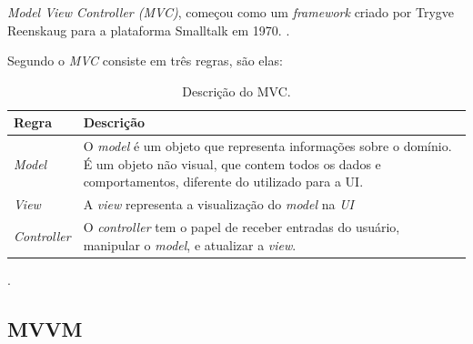 \textit{Model View Controller (MVC)}, começou como um \textit{framework} criado por Trygve Reenskaug para a plataforma Smalltalk em 1970. \cite[p.~321]{martin_fowler_patterns}.

Segundo  o \textit{MVC} consiste em três regras, são elas:

\begin{table}[htdp]
    \begin{center}
        \begin{tabular}{|l|p{10cm}|}
            \hline \textbf{Regra} & \textbf{Descrição} \\
            \hline \textit{Model} & 
            O \textit{model} é um objeto que representa informações sobre o domínio. É um objeto não visual, que contem todos os dados e comportamentos, diferente do utilizado para a UI. \\
            \hline \textit{View} & 
            A \textit{view} representa a visualização do \textit{model} na \textit{UI} \\
            \hline \textit{Controller} & 
            O \textit{controller} tem o papel de receber entradas do usuário, manipular o \textit{model}, e atualizar a \textit{view}. \\
            \hline
        \end{tabular}
        \caption{Descrição do MVC.}.
        \label{tbl:netcraft}
    \end{center}
\end{table}

\subsection{MVVM}